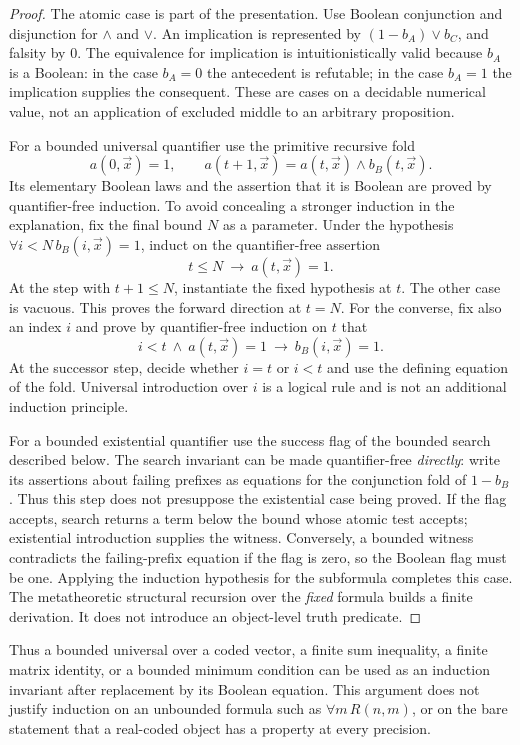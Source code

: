 \begin{proof}
The atomic case is part of the presentation.  Use Boolean conjunction and
disjunction for $\wedge$ and $\vee$.  An implication is represented by
$(1-b_A)\vee b_C$, and falsity by $0$.  The equivalence for implication is
intuitionistically valid because $b_A$ is a Boolean: in the case $b_A=0$ the
antecedent is refutable; in the case $b_A=1$ the implication supplies the
consequent.  These are cases on a decidable numerical value, not an application
of excluded middle to an arbitrary proposition.

For a bounded universal quantifier use the primitive recursive fold
\[
 a(0,\vec x)=1,\qquad
 a(t+1,\vec x)=a(t,\vec x)\wedge b_B(t,\vec x).
\]
Its elementary Boolean laws and the assertion that it is Boolean are proved
by quantifier-free induction.  To avoid concealing a stronger induction in
the explanation, fix the final bound $N$ as a parameter.  Under the hypothesis
$\forall i<N\,b_B(i,\vec x)=1$, induct on the quantifier-free assertion
\[
       t\le N\ \longrightarrow\ a(t,\vec x)=1.
\]
At the step with $t+1\le N$, instantiate the fixed hypothesis at $t$.  The
other case is vacuous.  This proves the forward direction at $t=N$.
For the converse, fix also an index $i$ and prove by quantifier-free induction
on $t$ that
\[
 i<t\ \wedge\ a(t,\vec x)=1
       \ \longrightarrow\ b_B(i,\vec x)=1.
\]
At the successor step, decide whether $i=t$ or $i<t$ and use the defining
equation of the fold.  Universal introduction over $i$ is a logical rule and
is not an additional induction principle.

For a bounded existential quantifier use the success flag of the bounded
search described below.  The search invariant can be made quantifier-free
\emph{directly}: write its assertions about failing prefixes as equations for
the conjunction fold of $1-b_B$.  Thus this step does not presuppose the
existential case being proved.  If the flag accepts, search returns a term
below the bound whose atomic test accepts; existential introduction supplies
the witness.  Conversely, a bounded witness contradicts the failing-prefix
equation if the flag is zero, so the Boolean flag must be one.  Applying the
induction hypothesis for the subformula completes this case.
The metatheoretic structural recursion over the \emph{fixed} formula builds a
finite derivation.  It does not introduce an object-level truth predicate.
\end{proof}

Thus a bounded universal over a coded vector, a finite sum inequality, a
finite matrix identity, or a bounded minimum condition can be used as an
induction invariant after replacement by its Boolean equation.  This argument
does not justify induction on an unbounded formula such as
$\forall m\,R(n,m)$, or on the bare statement that a real-coded object has a
property at every precision.

